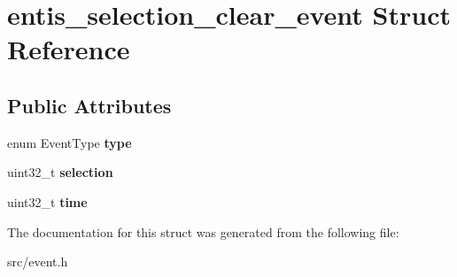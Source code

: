 \hypertarget{structentis__selection__clear__event}{}\section{entis\+\_\+selection\+\_\+clear\+\_\+event Struct Reference}
\label{structentis__selection__clear__event}
\subsection*{Public Attributes}
\begin{DoxyCompactItemize}
\item 
\mbox{\label{structentis__selection__clear__event_a01326ac6bcfc5f3016acaf8809b085bf}} 
enum Event\+Type {\bfseries type}
\item 
\mbox{\label{structentis__selection__clear__event_ad0db2da6bacd76b164c6b22e61a4f5cf}} 
uint32\+\_\+t {\bfseries selection}
\item 
\mbox{\label{structentis__selection__clear__event_ab92a58eaa28b509dba7d539ae0ff8710}} 
uint32\+\_\+t {\bfseries time}
\end{DoxyCompactItemize}


The documentation for this struct was generated from the following file\+:\begin{DoxyCompactItemize}
\item 
src/event.\+h\end{DoxyCompactItemize}

